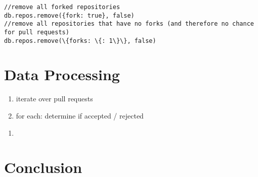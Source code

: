 \begin{lstlisting}
//remove all forked repositories
db.repos.remove({fork: true}, false)
//remove all repositories that have no forks (and therefore no chance for pull requests)
db.repos.remove(\{forks: \{: 1\}\}, false)
\end{lstlisting}

\section{Data Processing} %
\label{sec:data_processing}


\begin{enumerate}
	\item iterate over pull requests
	\item for each: determine if accepted / rejected
\end{enumerate}


\begin{enumerate}
	\item
\end{enumerate}


\section{Conclusion}\label{Conclusion}
